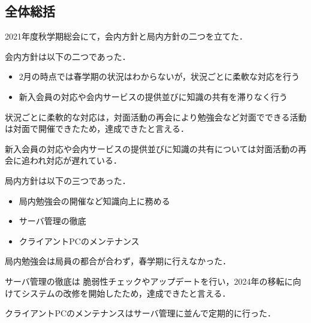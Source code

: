 \subsection*{全体総括}


2021年度秋学期総会にて，会内方針と局内方針の二つを立てた．

会内方針は以下の二つであった．
\begin{itemize}
  \item 2月の時点では春学期の状況はわからないが，状況ごとに柔軟な対応を行う
  \item 新入会員の対応や会内サービスの提供並びに知識の共有を滞りなく行う
\end{itemize}
状況ごとに柔軟的な対応は，対面活動の再会により勉強会など対面でできる活動は対面で開催できたため，達成できたと言える．

新入会員の対応や会内サービスの提供並びに知識の共有については対面活動の再会に追われ対応が遅れている．

局内方針は以下の三つであった．
\begin{itemize}
  \item 局内勉強会の開催など知識向上に務める
  \item サーバ管理の徹底
  \item クライアントPCのメンテナンス
\end{itemize}
局内勉強会は局員の都合が合わず，春学期に行えなかった．

サーバ管理の徹底は
脆弱性チェックやアップデートを行い，2024年の移転に向けてシステムの改修を開始したため，達成できたと言える．

クライアントPCのメンテナンスはサーバ管理に並んで定期的に行った．
